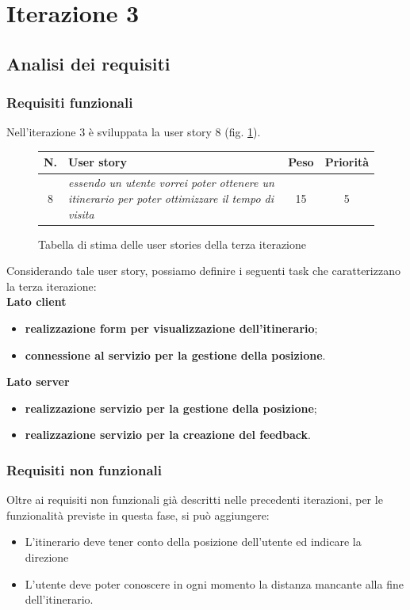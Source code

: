 \clearpage

\section{Iterazione 3}

\subsection{Analisi dei requisiti}
\subsubsection{Requisiti funzionali}
Nell'iterazione 3 è sviluppata la user story 8 (fig. \ref{userstoriestableterzaiterazione}). 
\begin{figure}[h!]
\begin{center}
\begin{tabular}[c]{|c|p{6cm}|c|c|}
\hline
N. & User story & Peso & Priorità\\
\hline
8 & \textit{essendo un utente vorrei poter ottenere un itinerario per poter ottimizzare il tempo di visita} & 15 & 5\\
\hline
\end{tabular}
\caption{Tabella di stima delle user stories della terza iterazione\label{userstoriestableterzaiterazione}}
\end{center}
\end{figure}

Considerando tale user story, possiamo definire i seguenti task che caratterizzano la terza iterazione:\\
\textbf{Lato client}
\begin{itemize}
\item \textbf{realizzazione form per visualizzazione dell'itinerario};
\item \textbf{connessione al servizio per la gestione della posizione}.
\end{itemize}

\textbf{Lato server}
\begin{itemize}
\item \textbf{realizzazione servizio per la gestione della posizione};
\item \textbf{realizzazione servizio per la creazione del feedback}.
\end{itemize}

\subsubsection{Requisiti non funzionali}
Oltre ai requisiti non funzionali già descritti nelle precedenti iterazioni, per le funzionalità previste in questa fase, si può aggiungere:
\begin{itemize}
\item L'itinerario deve tener conto della posizione dell'utente ed indicare la direzione
\item L'utente deve poter conoscere in ogni momento la distanza mancante alla fine dell'itinerario.
\end{itemize}

